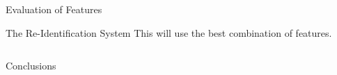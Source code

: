 \documentclass[final]{beamer}
\begin{document}
\begin{frame}{}
\begin{columns}[t]
\begin{column}{.48\linewidth}
\begin{block}{Evaluation of Features}
        \end{block}

 		\begin{block}{The Re-Identification System}
 		This will use the best combination of features. 

         

        \end{block}

      \end{column}
    \end{columns}
    
    \begin{block}{Conclusions}

         

        \end{block}

  \end{frame}
\end{document}
